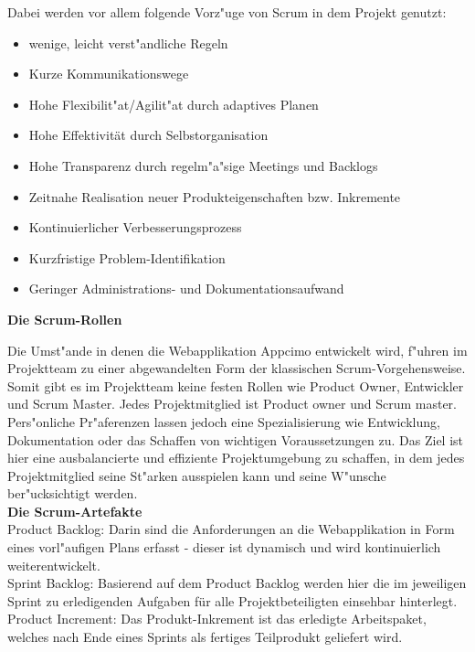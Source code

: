 \documentclass[a4paper, 11pt]{scrreprt}
\begin{document}
Dabei werden vor allem folgende Vorz"uge von Scrum in dem Projekt genutzt:

\begin{itemize}
\item{wenige, leicht verst"andliche Regeln}
\item{Kurze Kommunikationswege}
\item{Hohe Flexibilit"at/Agilit"at durch adaptives Planen}
\item{Hohe Effektivität durch Selbstorganisation}
\item{Hohe Transparenz durch regelm"a"sige Meetings und Backlogs}
\item{Zeitnahe Realisation neuer Produkteigenschaften bzw. Inkremente}
\item{Kontinuierlicher Verbesserungsprozess}
\item{Kurzfristige Problem-Identifikation}
\item{Geringer Administrations- und Dokumentationsaufwand}
\end{itemize}


\textbf{Die Scrum-Rollen} 

Die Umst"ande in denen die Webapplikation Appcimo entwickelt wird, f"uhren im Projektteam zu einer abgewandelten Form der klassischen Scrum-Vorgehensweise. \\

Somit gibt es im Projektteam keine festen Rollen wie Product Owner, Entwickler und Scrum Master. Jedes Projektmitglied ist Product owner und Scrum master. Pers"onliche Pr"aferenzen lassen jedoch eine Spezialisierung wie Entwicklung, Dokumentation oder das Schaffen von wichtigen Voraussetzungen zu. Das Ziel ist hier eine ausbalancierte und effiziente Projektumgebung zu schaffen, in dem jedes Projektmitglied seine St"arken ausspielen kann und seine W"unsche ber"ucksichtigt werden. \\


\textbf{Die Scrum-Artefakte} \\

Product Backlog: Darin sind die Anforderungen an die Webapplikation in Form eines vorl"aufigen Plans erfasst - dieser ist dynamisch und wird kontinuierlich weiterentwickelt. \\

Sprint Backlog: Basierend auf dem Product Backlog werden hier die im jeweiligen Sprint zu erledigenden Aufgaben für alle Projektbeteiligten einsehbar hinterlegt.\\

Product Increment: Das Produkt-Inkrement ist das erledigte Arbeitspaket, welches nach Ende eines Sprints als fertiges Teilprodukt geliefert wird.\\
\end{document}
